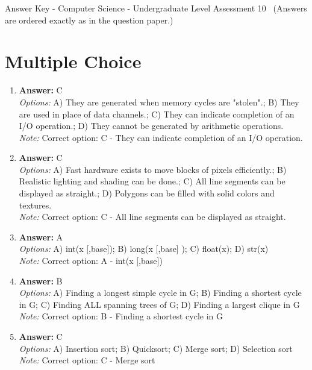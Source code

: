 \documentclass[12pt]{article}
\begin{document}
\begin{center}
Answer Key - Computer Science - Undergraduate Level Assessment 10 \
\small (Answers are ordered exactly as in the question paper.)
\end{center}

\section*{Multiple Choice}
\begin{enumerate}[label=\arabic*.]
\item \textbf{Answer:} C
\\ \textit{Options:} A) They are generated when memory cycles are "stolen".; B) They are used in place of data channels.; C) They can indicate completion of an I/O operation.; D) They cannot be generated by arithmetic operations.
\\ \textit{Note:} Correct option: C - They can indicate completion of an I/O operation.
\item \textbf{Answer:} C
\\ \textit{Options:} A) Fast hardware exists to move blocks of pixels efficiently.; B) Realistic lighting and shading can be done.; C) All line segments can be displayed as straight.; D) Polygons can be filled with solid colors and textures.
\\ \textit{Note:} Correct option: C - All line segments can be displayed as straight.
\item \textbf{Answer:} A
\\ \textit{Options:} A) int(x [,base]); B) long(x [,base] ); C) float(x); D) str(x)
\\ \textit{Note:} Correct option: A - int(x [,base])
\item \textbf{Answer:} B
\\ \textit{Options:} A) Finding a longest simple cycle in G; B) Finding a shortest cycle in G; C) Finding ALL spanning trees of G; D) Finding a largest clique in G
\\ \textit{Note:} Correct option: B - Finding a shortest cycle in G
\item \textbf{Answer:} C
\\ \textit{Options:} A) Insertion sort; B) Quicksort; C) Merge sort; D) Selection sort
\\ \textit{Note:} Correct option: C - Merge sort
\end{enumerate}
\end{document}
